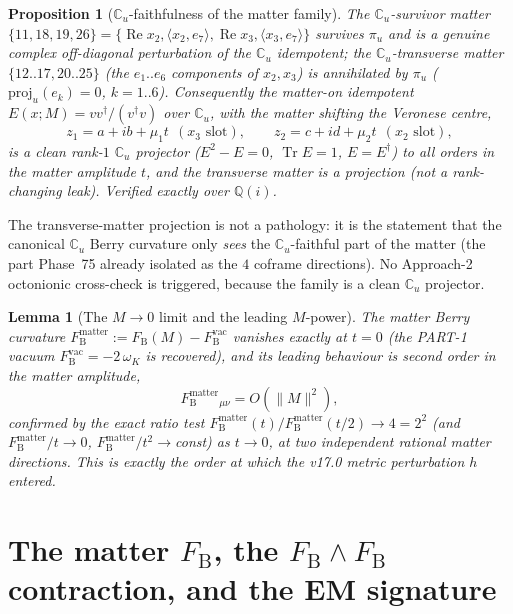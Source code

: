 \documentclass[11pt]{article}
\newcommand{\Tr}{\operatorname{Tr}}
\renewcommand{\Re}{\operatorname{Re}}
\newcommand{\Cu}{\mathbb{C}_u}
\newcommand{\FB}{F_{\mathrm{B}}}
\theoremstyle{plain}
\newtheorem{proposition}{Proposition}
\newtheorem{lemma}{Lemma}
\theoremstyle{definition}
\begin{document}
\begin{proposition}[$\Cu$-faithfulness of the matter family]
\label{prop:faithful}
The $\Cu$-survivor matter $\{11,18,19,26\}=\{\Re x_2,\langle x_2,e_7\rangle,\Re x_3,
\langle x_3,e_7\rangle\}$ survives $\pi_u$ and is a genuine complex off-diagonal
perturbation of the $\Cu$ idempotent; the $\Cu$-transverse matter $\{12..17,20..25\}$
(the $e_1..e_6$ components of $x_2,x_3$) is annihilated by $\pi_u$
($\mathrm{proj}_u(e_k)=0$, $k=1..6$). Consequently the matter-on idempotent
$E(x;M)=v v^\dagger/(v^\dagger v)$ over $\Cu$, with the matter shifting the Veronese
centre,
\begin{equation}
  z_1 = a + i b + \mu_1 t\ \ (x_3\text{ slot}),\qquad
  z_2 = c + i d + \mu_2 t\ \ (x_2\text{ slot}),
  \label{eq:matter-chart}
\end{equation}
is a clean rank-$1$ $\Cu$ projector ($E^2-E=0$, $\Tr E=1$, $E=E^\dagger$) to \emph{all}
orders in the matter amplitude $t$, and the transverse matter is a projection (not a
rank-changing leak). Verified exactly over $\mathbb{Q}(i)$.
\end{proposition}

The transverse-matter projection is not a pathology: it is the statement that the
canonical $\Cu$ Berry curvature only \emph{sees} the $\Cu$-faithful part of the matter
(the part Phase~75 already isolated as the $4$ coframe directions). No Approach-2
octonionic cross-check is triggered, because the family is a clean $\Cu$ projector.

\begin{lemma}[The $M\to0$ limit and the leading $M$-power]
\label{lem:Mlimit}
The matter Berry curvature $\FB^{\mathrm{matter}}:=\FB(M)-\FB^{\mathrm{vac}}$ vanishes
exactly at $t=0$ (the PART-1 vacuum $\FB^{\mathrm{vac}}=-2\,\omega_K$ is recovered), and
its leading behaviour is \emph{second order} in the matter amplitude,
\begin{equation}
  \FB^{\mathrm{matter}}_{\mu\nu} = O(\|M\|^2),
  \label{eq:Mpower}
\end{equation}
confirmed by the exact ratio test $\FB^{\mathrm{matter}}(t)/\FB^{\mathrm{matter}}(t/2)
\to 4 = 2^2$ (and $\FB^{\mathrm{matter}}/t\to0$, $\FB^{\mathrm{matter}}/t^2\to$const) as
$t\to0$, at two independent rational matter directions. This is \emph{exactly} the order
at which the v17.0 metric perturbation $h$ entered.
\end{lemma}

\section{The matter $\FB$, the $\FB\wedge\FB$ contraction, and the EM signature}
\label{sec:FBmatter}
\end{document}
